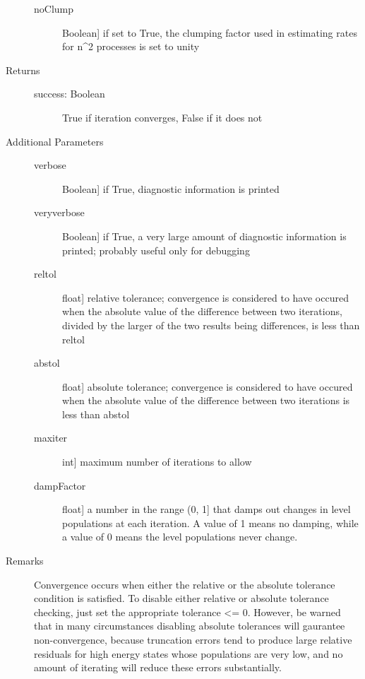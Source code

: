 \documentclass[letterpaper,10pt,english]{sphinxmanual}
\begin{document}
\begin{fulllineitems}
\begin{fulllineitems}
\begin{description}
\begin{description}
\item[{noClump}] \leavevmode{[}Boolean{]}
if set to True, the clumping factor used in estimating
rates for n\textasciicircum{}2 processes is set to unity

\end{description}

\item[{Returns}] \leavevmode\begin{description}
\item[{success: Boolean}] \leavevmode
True if iteration converges, False if it does not

\end{description}

\item[{Additional Parameters}] \leavevmode\begin{description}
\item[{verbose}] \leavevmode{[}Boolean{]}
if True, diagnostic information is printed

\item[{veryverbose}] \leavevmode{[}Boolean{]}
if True, a very large amount of diagnostic information is
printed; probably useful only for debugging

\item[{reltol}] \leavevmode{[}float{]}
relative tolerance; convergence is considered to have
occured when the absolute value of the difference
between two iterations, divided by the larger of the two
results being differences, is less than reltol

\item[{abstol}] \leavevmode{[}float{]}
absolute tolerance; convergence is considered to have
occured when the absolute value of the difference
between two iterations is less than abstol

\item[{maxiter}] \leavevmode{[}int{]}
maximum number of iterations to allow

\item[{dampFactor}] \leavevmode{[}float{]}
a number in the range (0, 1{]} that damps out changes in level
populations at each iteration. A value of 1 means no
damping, while a value of 0 means the level populations
never change.

\end{description}

\item[{Remarks}] \leavevmode
Convergence occurs when either the relative or the absolute
tolerance condition is satisfied. To disable either relative
or absolute tolerance checking, just set the appropriate
tolerance \textless{}= 0. However, be warned that in many circumstances
disabling absolute tolerances will gaurantee non-convergence,
because truncation errors tend to produce large relative
residuals for high energy states whose populations are very
low, and no amount of iterating will reduce these errors
substantially.


\end{description}
\end{fulllineitems}
\end{fulllineitems}
\end{document}
